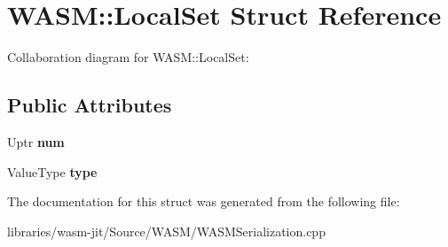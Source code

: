\hypertarget{struct_w_a_s_m_1_1_local_set}{}\section{W\+A\+SM\+:\+:Local\+Set Struct Reference}
\label{struct_w_a_s_m_1_1_local_set}


Collaboration diagram for W\+A\+SM\+:\+:Local\+Set\+:
\subsection*{Public Attributes}
\begin{DoxyCompactItemize}
\item 
\mbox{\label{struct_w_a_s_m_1_1_local_set_a69039152612e093cb4acdfd615933375}} 
Uptr {\bfseries num}
\item 
\mbox{\label{struct_w_a_s_m_1_1_local_set_abbcb09e6ba02df8e9de26c73cc97326c}} 
Value\+Type {\bfseries type}
\end{DoxyCompactItemize}


The documentation for this struct was generated from the following file\+:\begin{DoxyCompactItemize}
\item 
libraries/wasm-\/jit/\+Source/\+W\+A\+S\+M/W\+A\+S\+M\+Serialization.\+cpp\end{DoxyCompactItemize}
